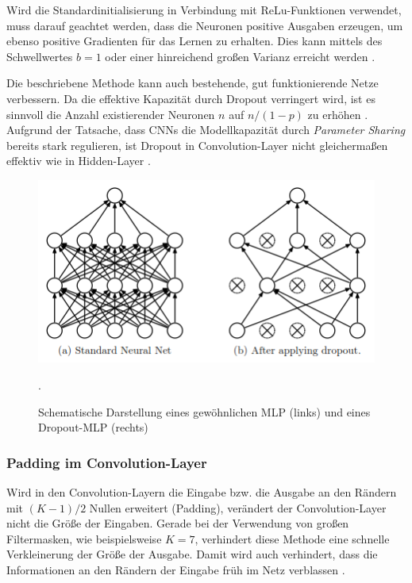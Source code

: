 Wird die Standardinitialisierung in Verbindung mit ReLu-Funk\-tionen verwendet, muss darauf geachtet werden, dass die Neuronen positive Ausgaben erzeugen, um ebenso positive Gradienten für das Lernen zu erhalten. Dies kann mittels des Schwellwertes $b=1$ oder einer hinreichend großen Varianz erreicht werden \cite[vgl.][]{Hinton2012}.

Die beschriebene Methode kann auch bestehende, gut funktionierende Netze verbessern. Da die effektive Kapazität durch Dropout verringert wird, ist es sinnvoll die Anzahl existierender Neuronen $n$ auf $n/(1-p)$ zu erhöhen \cite[vgl.][]{Srivastava2014}. Aufgrund der Tatsache, dass CNNs die Modellkapazität durch \textit{Parameter Sharing} bereits stark regulieren, ist Dropout in Convolution-Layer nicht gleichermaßen effektiv wie in Hidden-Layer \cite[vgl.][]{Hinton2012}.	

\begin{figure}
\centering
\includegraphics[width=0.6\linewidth]{images/4_dropout}
\caption[]{Schematische Darstellung eines gewöhnlichen MLP (links) und eines Dropout-MLP (rechts) \cite[siehe][]{Srivastava2014}}.
\label{fig:4_dropout}
\end{figure}			
	
\subsubsection{Padding im Convolution-Layer}
Wird in den Convolution-Layern die Eingabe bzw. die Ausgabe an den Rändern mit $(K - 1) / 2$ Nullen erweitert (Padding), verändert der Convolution-Layer nicht die Größe der Eingaben. Gerade bei der Verwendung von großen Filtermasken, wie beispielsweise $K = 7$, verhindert diese Methode eine schnelle Verkleinerung der Größe der Ausgabe. Damit wird auch verhindert, dass die Informationen an den Rändern der Eingabe früh im Netz verblassen \cite[vgl.][]{Kaparthy2014}. \\
		
				
